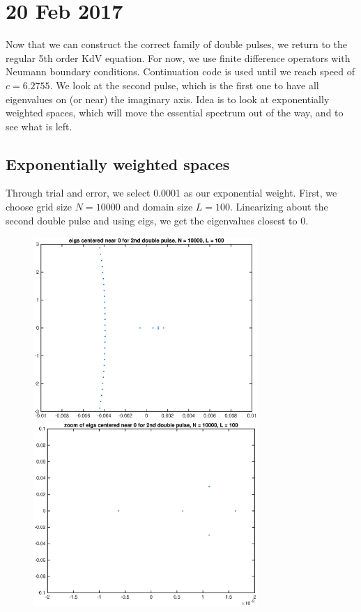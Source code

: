 \documentclass[12pt]{article}
\begin{document}
\section*{20 Feb 2017}
Now that we can construct the correct family of double pulses, we return to the regular 5th order KdV equation. For now, we use finite difference operators with Neumann boundary conditions. Continuation code is used until we reach speed of $c = 6.2755$. We look at the second pulse, which is the first one to have all eigenvalues on (or near) the imaginary axis. Idea is to look at exponentially weighted spaces, which will move the essential spectrum out of the way, and to see what is left.

\subsection*{Exponentially weighted spaces}
Through trial and error, we select 0.0001 as our exponential weight. First, we choose grid size $N = 10000$ and domain size $L = 100$. Linearizing about the second double pulse and using eigs, we get the eigenvalues closest to 0.

\begin{figure}[H]
\includegraphics[width=8.5cm]{eigs1.eps}
\includegraphics[width=8.5cm]{eigs1zoom.eps}
\end{figure}
\end{document}
